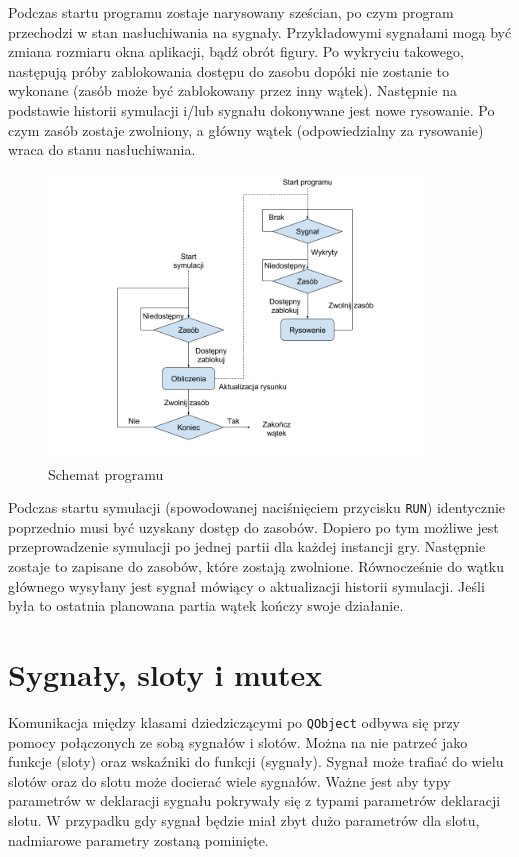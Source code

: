 Podczas startu programu zostaje narysowany sześcian, po czym program przechodzi w stan nasłuchiwania na sygnały. Przykładowymi sygnałami mogą być zmiana rozmiaru okna aplikacji, bądź obrót figury. Po wykryciu takowego, następują próby zablokowania dostępu do zasobu dopóki nie zostanie to wykonane (zasób może być zablokowany przez inny wątek). Następnie na podstawie historii symulacji i/lub sygnału dokonywane jest nowe rysowanie. Po czym zasób zostaje zwolniony, a główny wątek (odpowiedzialny za rysowanie) wraca do stanu nasłuchiwania. 
\begin{figure}
    \centering
    \includegraphics[width=0.9\textwidth]{pict/schemat.png}   
    \caption{Schemat programu}
	\label{fig:schemat} 
\end{figure}
Podczas startu symulacji (spowodowanej naciśnięciem przycisku \texttt{RUN}) identycznie poprzednio musi być uzyskany dostęp do zasobów. Dopiero po tym możliwe jest przeprowadzenie symulacji po jednej partii dla każdej instancji gry. Następnie zostaje to zapisane do zasobów, które zostają zwolnione. Równocześnie do wątku głównego wysyłany jest sygnał mówiący o aktualizacji historii symulacji. Jeśli była to ostatnia planowana partia wątek kończy swoje działanie.

\section{Sygnały, sloty i mutex}
\label{sec::sig_slot}
Komunikacja między klasami dziedziczącymi po \texttt{QObject} odbywa się przy pomocy połączonych ze sobą sygnałów i slotów. Można na nie patrzeć jako funkcje (sloty) oraz wskaźniki do funkcji (sygnały). Sygnał może trafiać do wielu slotów oraz do slotu może docierać wiele sygnałów. Ważne jest aby typy parametrów w deklaracji sygnału pokrywały się z typami parametrów deklaracji slotu. W przypadku gdy sygnał będzie miał zbyt dużo parametrów dla slotu, nadmiarowe parametry zostaną pominięte.


